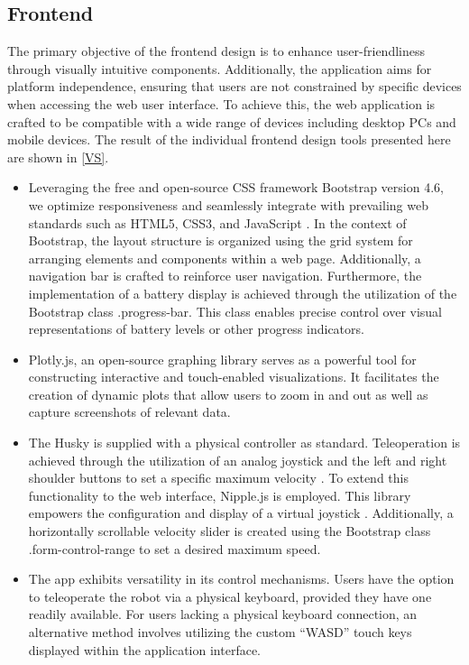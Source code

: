 \documentclass[conference]{IEEEtran}
\begin{document}
\subsection{Frontend}
The primary objective of the frontend design is to enhance user-friendliness through visually intuitive components. Additionally, the application aims for platform independence, ensuring that users are not constrained by specific devices when accessing the web user interface. 
To achieve this, the web application is crafted to be compatible with a wide range of devices including desktop PCs and mobile devices. The result of the individual frontend design tools presented here are shown in \ref{VS}.
\begin{itemize}
\item Leveraging the free and open-source CSS framework Bootstrap version 4.6, we optimize responsiveness and seamlessly integrate with prevailing web standards such as HTML5, CSS3, and JavaScript \cite{bootstrap}. 
In the context of Bootstrap, the layout structure is organized using the grid system for arranging elements and components within a web page. 
Additionally, a navigation bar is crafted to reinforce user navigation.
Furthermore, the implementation of a battery display is achieved through the utilization of the Bootstrap class .progress-bar. 
This class enables precise control over visual representations of battery levels or other progress indicators.
\item Plotly.js, an open-source graphing library serves as a powerful tool for constructing interactive and touch-enabled visualizations. It facilitates the creation of dynamic plots that allow users to zoom in and out as well as capture screenshots of relevant data. \cite{plotly}
\item The Husky is supplied with a physical controller as standard. Teleoperation is achieved through the utilization of an analog joystick and the left and right shoulder buttons to set a specific maximum velocity \cite{huskydriving}.
To extend this functionality to the web interface, Nipple.js is employed. This library empowers the configuration and display of a virtual joystick \cite{nipplejs}. Additionally, a horizontally scrollable velocity slider is created using the Bootstrap class .form-control-range to set a desired maximum speed.
\item The app exhibits versatility in its control mechanisms. Users have the option to teleoperate the robot via a physical keyboard, provided they have one readily available. For users lacking a physical keyboard connection, an alternative method involves utilizing the custom “WASD” touch keys displayed within the application interface. 

\end{itemize}
\end{document}
